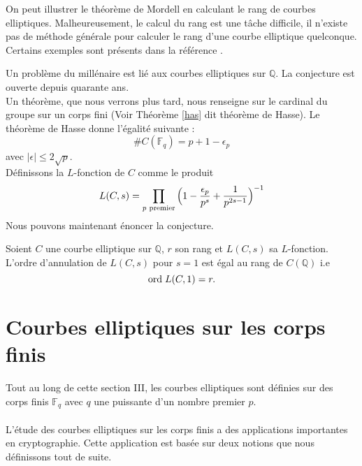 \documentclass[a4paper]{article}
\begin{document}
\begin{rem}
\normalfont
On peut illustrer le théorème de Mordell en calculant le 
rang de courbes elliptiques. Malheureusement, le calcul du rang est une tâche difficile, il n'existe pas de méthode générale pour calculer le rang d'une courbe elliptique quelconque. Certains exemples sont présents dans la référence \cite{ref}.
\end{rem}

\begin{rem}
\normalfont
Un problème du millénaire est lié aux courbes elliptiques sur $\mathbb{Q}$. La conjecture est ouverte depuis quarante ans. \\
Un théorème, que nous verrons plus tard, nous renseigne sur le cardinal du groupe sur un corps fini (Voir Théorème \ref{has} dit théorème de Hasse). Le théorème de Hasse donne l'égalité suivante :
\begin{equation*}
\#C(\mathbb{F}_{q})=p+1-\epsilon_{p}
\end{equation*}
avec $|\epsilon| \leqslant 2\sqrt{p}$. \\
Définissons la $L$-fonction de $C$ comme le produit 
\begin{equation*}
L(C,s)=\prod\limits_{p \hspace{0.1cm} \text{premier}} \Big(1-\frac{\epsilon_{p}}{p^s}+\frac{1}{p^{2s-1}}\Big)^{-1}
\end{equation*}
Nous pouvons maintenant énoncer la conjecture.
\begin{conj}
Soient $C$ une courbe elliptique sur $\mathbb{Q}$, $r$ son rang et $L(C,s)$ sa $L$-fonction. L'ordre d'annulation de $L(C,s)$ pour $s=1$ est égal au rang de $C(\mathbb{Q})$ i.e
\begin{equation*}
\text{ord} \hspace{0.1cm} L(C,1)=r.
\end{equation*}
\end{conj}
\end{rem}
\newpage


\section{Courbes elliptiques sur les corps finis}
\noindent Tout au long de cette section III, les courbes elliptiques sont définies sur des corps finis $\mathbb{F}_q$ avec $q$ une puissante d'un nombre premier $p$. \\ \\
L'étude des courbes elliptiques sur les corps finis a des applications importantes en cryptographie. Cette application est basée sur deux notions que nous définissons tout de suite.
\end{document}
